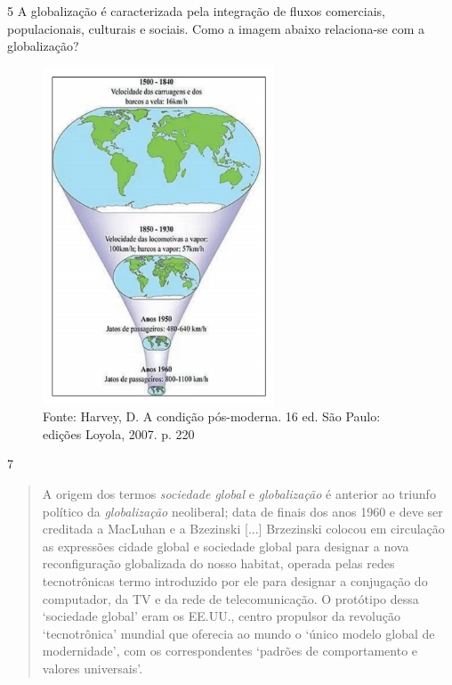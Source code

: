 \num{5} A globalização é caracterizada pela integração de fluxos comerciais,
populacionais, culturais e sociais. Como a imagem abaixo relaciona-se
com a globalização?


\begin{figure}[htpb!]
\includegraphics[width=2.70776in,height=3.93646in]{./imgs/img2.png}
\caption{Fonte: Harvey, D. A condição pós-moderna. 16 ed. São Paulo: edições Loyola, 2007. p. 220}
\end{figure}


\num{7}

\begin{quote}
A origem dos termos \emph{sociedade global}
e \emph{globalização} é anterior ao triunfo político
da \emph{globalização} neoliberal; data
de finais dos anos 1960 e deve ser creditada a MacLuhan e a Bzezinski
{[}...{]} Brzezinski colocou em circulação as expressões cidade global e
sociedade global para designar a nova reconfiguração globalizada do
nosso habitat, operada pelas redes tecnotrônicas termo introduzido por
ele para designar a conjugação do computador, da TV e da rede de
telecomunicação. O protótipo dessa `sociedade global' eram os EE.UU.,
centro propulsor da revolução `tecnotrônica' mundial que oferecia ao
mundo o `único modelo global de modernidade', com os correspondentes
`padrões de comportamento e valores universais'.

\end{quote}

